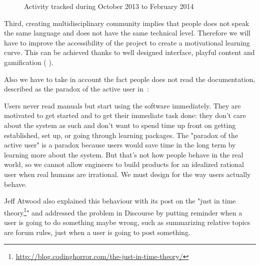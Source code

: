\begin{figure}[tb]
\centering
    \hfil
    \caption{Activity tracked during October 2013 to February 2014}
    \label{fig:poppy_community}
\end{figure}


Third, creating multidisciplinary community implies that people does not speak the same language and does not have the same technical level. Therefore we will have to improve the accessibility of the project to create a motivational learning curve. This can be achieved thanks to well designed interface, playful content and gamification (\cite{deterding2011game} \cite{groh2012gamification}).


Also we have to take in account the fact people does not read the documentation, described as the paradox of the active user in~\parencite{carroll1987paradox}:
\begin{formal}
    Users never read manuals but start using the software immediately. They are motivated to get started and to get their immediate task done: they don't care about the system as such and don't want to spend time up front on getting established, set up, or going through learning packages.
    The "paradox of the active user" is a paradox because users would save time in the long term by learning more about the system. But that's not how people behave in the real world, so we cannot allow engineers to build products for an idealized rational user when real humans are irrational. We must design for the way users actually behave.
\end{formal}

Jeff Atwood also explained this behaviour with its post on the "just in time theory\footnote{\url{http://blog.codinghorror.com/the-just-in-time-theory/}}" and addressed the problem in Discourse by putting reminder when a user is going to do something maybe wrong, such as summarizing relative topics are forum rules, just when a user is going to post something.

